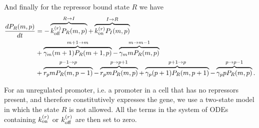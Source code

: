And finally for the repressor bound state $R$ we have
\begin{equation}
  \begin{aligned}
    \dt{P_R(m, p)} &=
    - \overbrace{\kroff P_R(m, p)}^{R \rightarrow I} %
    + \overbrace{\kron P_I(m, p)}^{I \rightarrow R}\\ %
    &+ \overbrace{\gm (m + 1) P_R(m+1 , p)}^{m+1 \rightarrow m} %
    - \overbrace{\gm m P_R(m , p)}^{m \rightarrow m-1}\\ %
    &+ \overbrace{r_p m P_R(m, p - 1)}^{p-1 \rightarrow p} %
    - \overbrace{r_p m P_R(m, p)}^{p \rightarrow p+1} %
    + \overbrace{\gp (p + 1) P_R(m, p + 1)}^{p + 1 \rightarrow p} %
    - \overbrace{\gp p P_R(m, p)}^{p \rightarrow p-1}. %
  \end{aligned}
\end{equation}

For an unregulated promoter, i.e. a promoter in a cell that has no repressors
present, and therefore constitutively expresses the gene, we use a two-state
model in which the state $R$ is not allowed. All the terms in the system of ODEs
containing $k^{(r)}_{\text{on}}$ or $k^{(r)}_{\text{off}}$ are then set to zero.

